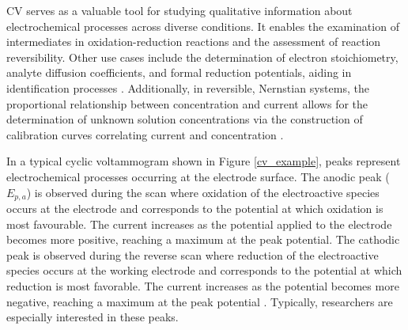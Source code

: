 CV serves as a valuable tool for studying qualitative information about electrochemical processes across diverse conditions. It enables the examination of intermediates in oxidation-reduction reactions and the assessment of reaction reversibility. Other use cases include the determination of electron stoichiometry, analyte diffusion coefficients, and formal reduction potentials, aiding in identification processes \cite{Nicholson1964}. Additionally, in reversible, Nernstian systems, the proportional relationship between concentration and current allows for the determination of unknown solution concentrations via the construction of calibration curves correlating current and concentration \cite{Libretexts_2023}.

In a typical cyclic voltammogram shown in Figure \ref{cv_example}, peaks represent electrochemical processes occurring at the electrode surface. The anodic peak ($E_{p, a}$) is observed during the scan where oxidation of the electroactive species occurs at the electrode and corresponds to the potential at which oxidation is most favourable. The current increases as the potential applied to the electrode becomes more positive, reaching a maximum at the peak potential. The cathodic peak is observed during the reverse scan where reduction of the electroactive species occurs at the working electrode and corresponds to the potential at which reduction is most favorable. The current increases as the potential becomes more negative, reaching a maximum at the peak potential \cite{GRIMSHAW20001}. Typically, researchers are especially interested in these peaks.
